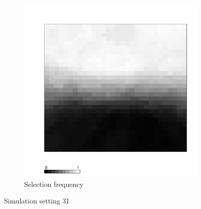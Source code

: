 \documentclass[authoryear, review, 11pt]{elsarticle}
\begin{document}
\begin{figure}
	\begin{subfigure}[b]{0.45\textwidth}
	\centering
		\includegraphics[width=\textwidth]{../../figures/simulation/X1.15.31.selection.pdf}
		\caption{Selection frequency}
	\end{subfigure}
	\caption{Simulation setting 31}
\end{figure}

\clearpage
\end{document}
